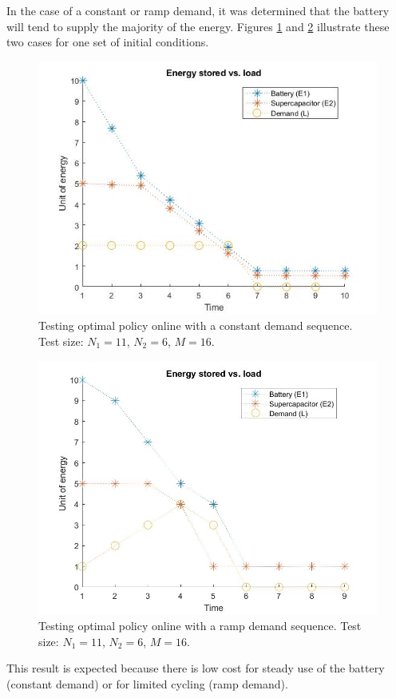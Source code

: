 \documentclass[conference]{IEEEtran}
\begin{document}
In the case of a constant or ramp demand, it was determined that the battery will tend to supply the majority of the energy. Figures \ref{fig:ConstDemand} and \ref{fig:RampDemand} illustrate these two cases for one set of initial conditions.
\begin{figure}[htbp]
\centerline{\includegraphics[scale=0.35]{EnergyStoredvsload_ConstantLoad(E1_max=10,E2_max=5).jpg}}
\caption{Testing optimal policy online with a constant demand sequence. Test size: $N_{1}=11$, $N_{2}=6$, $M=16$.}
\label{fig:ConstDemand}
\end{figure}
\begin{figure}[htbp]
\centerline{\includegraphics[scale=0.25]{EnergyStoredvsload_RampLoad(E1_max=10,E2_max=5).jpg}}
\caption{Testing optimal policy online with a ramp demand sequence. Test size: $N_{1}=11$, $N_{2}=6$, $M=16$.}
\label{fig:RampDemand}
\end{figure} This result is expected because there is low cost for steady use of the battery (constant demand) or for limited cycling (ramp demand).
\end{document}
